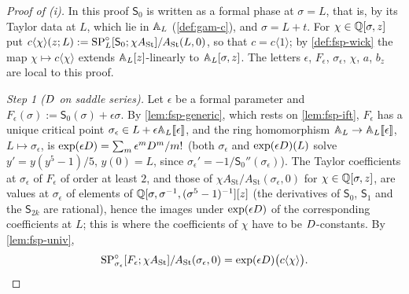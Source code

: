 \begin{proof}[Proof of (i)]
In this proof $\mathsf S_0$ is written as a formal phase at $\sigma=L$, that is, by its Taylor data at $L$, which lie in $\mathbb{A}_{L}$ (\cref{def:gam-c}), and $\sigma=L+t$. For $\chi\in\mathbb{Q}[\sigma,z]$ put $c\langle\chi\rangle(z;L):=\mathrm{SP}^{\circ}_L[\mathsf S_0;\chi A_{\mathrm{St}}]/A_{\mathrm{St}}(L,0)$, so that $c=c\langle1\rangle$; by \cref{def:fsp-wick} the map $\chi\mapsto c\langle\chi\rangle$ extends $\mathbb{A}_{L}[z]$-linearly to $\mathbb{A}_{L}[\sigma,z]$. The letters $\epsilon$, $F_\epsilon$, $\sigma_\epsilon$, $\chi$, $a$, $b_z$ are local to this proof.

\emph{Step 1 ($D$ on saddle series).} Let $\epsilon$ be a formal parameter and $F_\epsilon(\sigma):=\mathsf S_0(\sigma)+\epsilon\sigma$. By \cref{lem:fsp-generic}, which rests on \cref{lem:fsp-ift}, $F_\epsilon$ has a unique critical point $\sigma_\epsilon\in L+\epsilon\mathbb{A}_{L}[\![ \epsilon ]\!]$, and the ring homomorphism $\mathbb{A}_{L}\to\mathbb{A}_{L}[\![ \epsilon ]\!]$, $L\mapsto\sigma_\epsilon$, is $\exp(\epsilon D)=\sum_m\epsilon^mD^m/m!$ (both $\sigma_\epsilon$ and $\exp(\epsilon D)(L)$ solve $y'=y(y^5-1)/5$, $y(0)=L$, since $\sigma_\epsilon'=-1/\mathsf S_0''(\sigma_\epsilon)$). The Taylor coefficients at $\sigma_\epsilon$ of $F_\epsilon$ of order at least $2$, and those of $\chi A_{\mathrm{St}}/A_{\mathrm{St}}(\sigma_\epsilon,0)$ for $\chi\in\mathbb{Q}[\sigma,z]$, are values at $\sigma_\epsilon$ of elements of $\mathbb{Q}[\sigma,\sigma^{-1},(\sigma^5-1)^{-1}][z]$ (the derivatives of $\mathsf S_0$, $\mathsf S_1$ and the $\mathsf S_{2k}$ are rational), hence the images under $\exp(\epsilon D)$ of the corresponding coefficients at $L$; this is where the coefficients of $\chi$ have to be $D$-constants. By \cref{lem:fsp-univ},
\[
\mathrm{SP}^{\circ}_{\sigma_\epsilon}[F_\epsilon;\chi A_{\mathrm{St}}]/A_{\mathrm{St}}(\sigma_\epsilon,0)=\exp(\epsilon D)\bigl(c\langle\chi\rangle\bigr).
\]


\end{proof}
